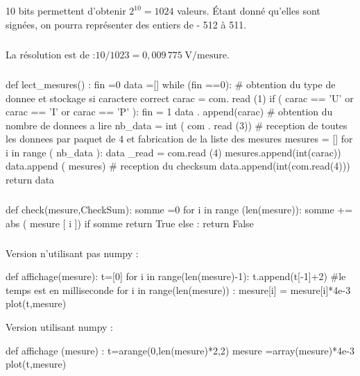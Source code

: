 \documentclass[10pt,fleqn]{article} %
\begin{document}

\vspace{8cm}
\pagestyle{fancy}
\thispagestyle{plain}


\def\columnseprulecolor{\color{ocre}}
\setlength{\columnseprule}{0.4pt} 

\subparagraph{}
10 bits permettent d’obtenir $2^{10} = 1024$ valeurs. Étant donné qu’elles sont signées, on pourra représenter des entiers de - 512 à 511.

\subparagraph{}
La résolution est de :$10 / 1023 = 0,009\,775\; \text{V} / \text{mesure}$.

\subparagraph{}
\begin{python}
def lect_mesures() :
    fin =0
    data =[]
    while (fin ==0):
        # obtention  du  type  de  donnee  et  stockage  si  caractere  correct
        carac = com. read (1)
        if  ( carac == 'U'  or  carac == 'I'  or  carac == 'P' ):
            fin  =  1
            data . append(carac)
            # obtention  du  nombre  de  donnees  a  lire
            nb_data = int ( com . read (3))
           # reception  de  toutes  les  donnees  par  paquet  de  4  et  fabrication de la liste des mesures
           mesures  =  []
           for  i  in  range ( nb_data ):
               data _read = com.read (4)
               mesures.append(int(carac))
           data.append ( mesures)
           # reception  du  checksum
          data.append(int(com.read(4)))
    return data
\end{python}



 
\subparagraph{}
\begin{python}
def check(mesure,CheckSum):
    somme =0
    for i in range (len(mesure)):
        somme += abs ( mesure [ i ])
    if somme %
        return True
    else :
        return  False
\end{python}


\subparagraph{}
Version n’utilisant  pas numpy :
\begin{python}
def affichage(mesure):
    t=[0]
    for i in range(len(mesure)-1):
        t.append(t[-1]+2)	#le temps est en milliseconde
    for i in range(len(mesure)) :
        mesure[i] = mesure[i]*4e-3
    plot(t,mesure)
\end{python}

Version utilisant  numpy :
\begin{python}
def affichage (mesure) :
    t=arange(0,len(mesure)*2,2)
    mesure =array(mesure)*4e-3
    plot(t,mesure)
\end{python}
\end{document}
